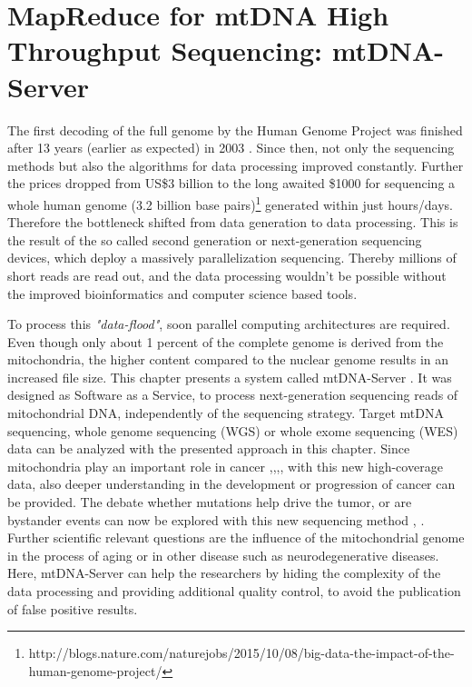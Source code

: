 \chapter{MapReduce for mtDNA High Throughput Sequencing: mtDNA-Server}
\label{chap:NGS}

The first decoding of the full genome by the Human Genome Project was finished after 13 years (earlier as expected) in 2003 \cite{InternationalHumanGenomeSequencingConsortium2004}. Since then, not only the sequencing methods but also the algorithms for data processing improved constantly. Further the prices dropped from US\$3 billion to the long awaited \$1000 for sequencing a whole human genome (3.2 billion base pairs)\footnote{http://blogs.nature.com/naturejobs/2015/10/08/big-data-the-impact-of-the-human-genome-project/} generated within just hours/days. Therefore the bottleneck shifted from data generation to data processing. This is the result of the so called second generation or next-generation sequencing devices, which deploy a massively parallelization sequencing. Thereby millions of short reads are read out, and the data processing wouldn't be possible without the improved bioinformatics and computer science based tools. 

To process this \textit{"data-flood"}, soon parallel computing architectures are required. Even though only about 1 percent of the complete genome is derived from the mitochondria, the higher content compared to the nuclear genome results in an increased file size. This chapter presents a system called mtDNA-Server \cite{Weissensteiner2016b}. It was designed as Software as a Service, to process next-generation sequencing reads of mitochondrial DNA, independently of the sequencing strategy. Target mtDNA sequencing, whole genome sequencing (WGS) or whole exome sequencing (WES) data can be analyzed with the presented approach in this chapter. Since mitochondria play an important role in cancer \cite{Brandon2006},\cite{He2010},\cite{Guo2012},\cite{KlossBrandstatter2010}, with this new high-coverage data, also deeper understanding in the development or progression of cancer can be provided. The debate whether mutations help drive the tumor, or are bystander events can now be explored with this new sequencing method \cite{McMahon2014}, \cite{Kloss-Brandstatter2015}. Further scientific relevant questions are the influence of the mitochondrial genome in the process of aging or in other disease such as neurodegenerative diseases. Here, mtDNA-Server can help the researchers by hiding the complexity of the data processing and providing additional quality control, to avoid the publication of false positive results. 

